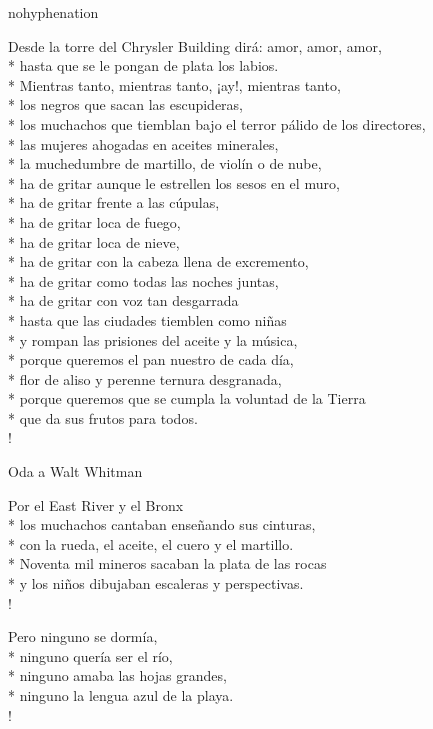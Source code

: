 \documentclass[
    a5paper,
    DIV=10,
    12pt,
    notitlepage,
    oneside,]
{scrbook} %
\begin{document}
\begin{hyphenrules}{nohyphenation}
\begin{poem}{Desde la torre del Chrysler Building}{}{\vspace{-1em}}
dirá: amor, amor, amor,\\*
hasta que se le pongan de plata los labios.\\*
Mientras tanto, mientras tanto, ¡ay!, mientras tanto,\\*
los negros que sacan las escupideras,\\*
los muchachos que tiemblan bajo el terror pálido de los directores,\\*
las mujeres ahogadas en aceites minerales,\\*
la muchedumbre de martillo, de violín o de nube,\\*
ha de gritar aunque le estrellen los sesos en el muro,\\*
ha de gritar frente a las cúpulas,\\*
ha de gritar loca de fuego,\\*
ha de gritar loca de nieve,\\*
ha de gritar con la cabeza llena de excremento,\\*
ha de gritar como todas las noches juntas,\\*
ha de gritar con voz tan desgarrada\\*
hasta que las ciudades tiemblen como niñas\\*
y rompan las prisiones del aceite y la música,\\*
porque queremos el pan nuestro de cada día,\\*
flor de aliso y perenne ternura desgranada,\\*
porque queremos que se cumpla la voluntad de la Tierra\\*
que da sus frutos para todos.\\!

\end{poem}

\begin{poem}{Oda a Walt Whitman}{}{\vspace{-1em}}

Por el East River y el Bronx\\*
los muchachos cantaban enseñando sus cinturas,\\*
con la rueda, el aceite, el cuero y el martillo.\\*
Noventa mil mineros sacaban la plata de las rocas\\*
y los niños dibujaban escaleras y perspectivas.\\!

Pero ninguno se dormía,\\*
ninguno quería ser el río,\\*
ninguno amaba las hojas grandes,\\*
ninguno la lengua azul de la playa.\\!


\end{poem}
\end{hyphenrules}
\end{document}
